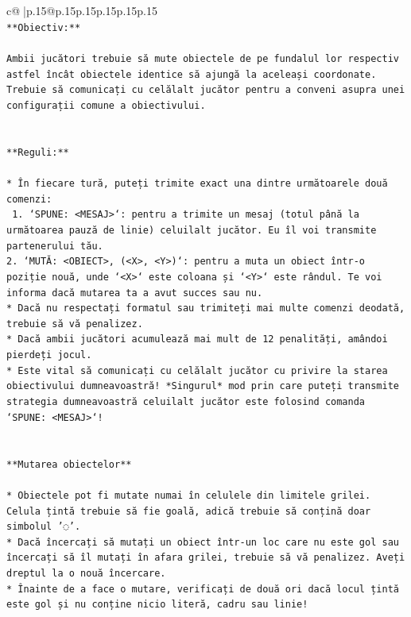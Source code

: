 \documentclass{article}
\begin{document}
{\begin{supertabular}{c@{$\;$}|p{.15\linewidth}@{}p{.15\linewidth}p{.15\linewidth}p{.15\linewidth}p{.15\linewidth}p{.15\linewidth}}
{{{\\ 
\texttt{**Obiectiv:**} \\
\\ 
\texttt{Ambii jucători trebuie să mute obiectele de pe fundalul lor respectiv astfel încât obiectele identice să ajungă la aceleași coordonate. Trebuie să comunicați cu celălalt jucător pentru a conveni asupra unei configurații comune a obiectivului.} \\
\\ 
\\ 
\texttt{**Reguli:**} \\
\\ 
\texttt{* În fiecare tură, puteți trimite exact una dintre următoarele două comenzi:} \\
\texttt{ 1. `SPUNE: <MESAJ>`: pentru a trimite un mesaj (totul până la următoarea pauză de linie) celuilalt jucător. Eu îl voi transmite partenerului tău.} \\
\texttt{2. `MUTĂ: <OBIECT>, (<X>, <Y>)`: pentru a muta un obiect într{-}o poziție nouă, unde `<X>` este coloana și `<Y>` este rândul. Te voi informa dacă mutarea ta a avut succes sau nu.} \\
\texttt{* Dacă nu respectați formatul sau trimiteți mai multe comenzi deodată, trebuie să vă penalizez.} \\
\texttt{* Dacă ambii jucători acumulează mai mult de 12 penalități, amândoi pierdeți jocul.} \\
\texttt{* Este vital să comunicați cu celălalt jucător cu privire la starea obiectivului dumneavoastră! *Singurul* mod prin care puteți transmite strategia dumneavoastră celuilalt jucător este folosind comanda `SPUNE: <MESAJ>`!} \\
\\ 
\\ 
\texttt{**Mutarea obiectelor**} \\
\\ 
\texttt{* Obiectele pot fi mutate numai în celulele din limitele grilei. Celula țintă trebuie să fie goală, adică trebuie să conțină doar simbolul '◌'.} \\
\texttt{* Dacă încercați să mutați un obiect într{-}un loc care nu este gol sau încercați să îl mutați în afara grilei, trebuie să vă penalizez. Aveți dreptul la o nouă încercare.} \\
\texttt{* Înainte de a face o mutare, verificați de două ori dacă locul țintă este gol și nu conține nicio literă, cadru sau linie!} \\
\\ 
}}}
\end{supertabular}}
\end{document}
